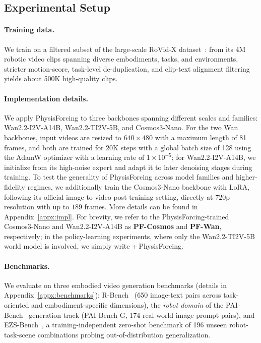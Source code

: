 \documentclass{llmxive}
\providecommand{\emph}[1]{\textit{#1}}
\begin{document}
\subsection{Experimental Setup}

\paragraph{Training data.}
We train on a filtered subset of the large-scale RoVid-X dataset~\cite{deng2026rethinking}: from its
4M robotic video clips spanning diverse embodiments, tasks, and environments, stricter motion-score,
task-level de-duplication, and clip-text alignment filtering yields about 500K high-quality clips.

\paragraph{Implementation details.} We apply PhysisForcing to three backbones spanning different
scales and families: Wan2.2-I2V-A14B, Wan2.2-TI2V-5B, and Cosmos3-Nano. For the two Wan backbones,
input videos are resized to $640\times480$ with a maximum length of 81 frames, and both are trained
for 20K steps with a global batch size of 128 using the AdamW optimizer with a learning rate of
$1\times10^{-5}$; for Wan2.2-I2V-A14B, we initialize from its high-noise expert and adapt it to
later denoising stages during training. To test the generality of PhysisForcing across model
families and higher-fidelity regimes, we additionally train the Cosmos3-Nano backbone with LoRA,
following its official image-to-video post-training setting, directly at $720$p resolution with up
to $189$ frames. More details can be found in Appendix~\ref{appx:impl}. For brevity, we refer to the
PhysisForcing-trained Cosmos3-Nano and Wan2.2-I2V-A14B as \textbf{PF-Cosmos} and \textbf{PF-Wan},
respectively; in the policy-learning experiments, where only the Wan2.2-TI2V-5B world model is
involved, we simply write \mbox{+\,PhysisForcing}.

\paragraph{Benchmarks.} We evaluate on three embodied video generation benchmarks (details in
Appendix~\ref{appx:benchmarks}): R-Bench~\cite{deng2026rethinking} (650 image-text pairs across
task-oriented and embodiment-specific dimensions), the \emph{robot domain} of the
PAI-Bench~\cite{zhou2025paibench} generation track (PAI-Bench-G, 174 real-world image-prompt
pairs), and EZS-Bench~\cite{ali2025abot}, a training-independent zero-shot benchmark of 196 unseen
robot-task-scene combinations probing out-of-distribution generalization.
\end{document}
